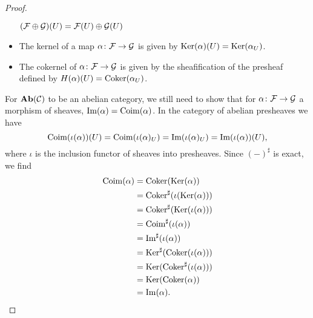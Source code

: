 \documentclass{article}
\begin{document}
\begin{proof}
\begin{itemize}
              $(\mathcal{F} \oplus \mathcal{G} )(U) = \mathcal{F}(U) \oplus \mathcal{G}(U)$
        \item The kernel of a map $\alpha \colon \mathcal{F} \to \mathcal{G}$ is given by
              $\operatorname{Ker}(\alpha)(U) = \operatorname{Ker}(\alpha_U)$.
        \item The cokernel of $\alpha \colon \mathcal{F} \to \mathcal{G}$
              is given by the sheafification of the presheaf defined by
              $H(\alpha)(U) = \operatorname{Coker}(\alpha_U)$.
    \end{itemize}
    For $\operatorname{\mathbf{Ab}}(\mathcal{C})$ to be an abelian category, we still need to
    show that for $\alpha \colon \mathcal{F} \to \mathcal{G}$ a morphism of sheaves,
    $\operatorname{Im}(\alpha) = \operatorname{Coim}(\alpha)$. In the category of abelian presheaves we have
    \begin{equation*}
        \operatorname{Coim}(\iota(\alpha))(U) = \operatorname{Coim}(\iota(\alpha)_U)
        = \operatorname{Im}(\iota(\alpha)_U) = \operatorname{Im}(\iota(\alpha))(U),
    \end{equation*}
    where $\iota$ is the inclusion functor of sheaves into presheaves.
    Since $(-)^\sharp$ is exact, we find
    \begin{align*}
        \operatorname{Coim}(\alpha)
         & = \operatorname{Coker}(\operatorname{Ker}(\alpha))               \\
         & = \operatorname{Coker}^\sharp(\iota(\operatorname{Ker}(\alpha))) \\
         & = \operatorname{Coker}^\sharp(\operatorname{Ker}(\iota(\alpha))) \\
         & = \operatorname{Coim}^\sharp(\iota(\alpha))       \\
         & = \operatorname{Im}^\sharp(\iota(\alpha))         \\
         & = \operatorname{Ker}^\sharp(\operatorname{Coker}(\iota(\alpha))) \\
         & = \operatorname{Ker}(\operatorname{Coker}^\sharp(\iota(\alpha))) \\
         & = \operatorname{Ker}(\operatorname{Coker}(\alpha))               \\
         & = \operatorname{Im}(\alpha).
    \end{align*}
\end{proof}
\end{document}
